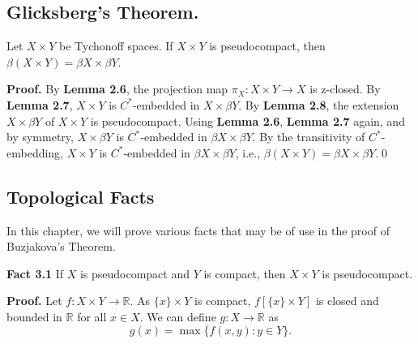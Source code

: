 \documentclass{article}
\begin{document}
\vskip 40pt

\subsection{Glicksberg's Theorem.} Let $X\times Y$ be Tychonoff spaces. If $X\times Y$ is pseudocompact, then $\beta(X\times Y)=\beta X\times \beta Y$. 

\vskip 20pt

\textbf{Proof. } By \textbf{Lemma 2.6}, the projection map $\pi_X: X\times Y\rightarrow X$ is z-closed. By \textbf{Lemma 2.7}, $X\times Y$ is $C^*$-embedded in $X\times \beta Y$. By \textbf{Lemma 2.8}, the extension $X\times \beta Y$ of $X\times Y$ is pseudocompact. Using \textbf{Lemma 2.6}, \textbf{Lemma 2.7} again, and by symmetry, $X\times \beta Y$ is $C^*$-embedded in $\beta X\times \beta Y$. By the transitivity of $C^*$-embedding, $X\times Y$ is $C^*$-embedded in $\beta X\times \beta Y$, i.e., $\beta (X\times Y)=\beta X\times \beta Y$.\qed
















\newpage














\begin{center}

\end{center}
\vskip 40pt
\begin{center}
\section{Topological Facts }
\end{center}
\vskip 20pt

In this chapter, we will prove various facts that may be of use in the proof of Buzjakova's Theorem.


\vskip 20pt
\textbf{Fact 3.1} If $X$ is pseudocompact and $Y$ is compact, then $X\times Y$ is pseudocompact. 

\vskip 15pt


\textbf{Proof.} Let $f: X\times Y \rightarrow \mathbb{R}$. As $\{x\}\times Y$ is compact, $f\left[ \{x\} \times Y\right] $ is 
closed and bounded in $\mathbb{R}$ for all $x \in X$. We can define $g:X \rightarrow \mathbb{R}$ as 
$$g(x)=\max \{f(x,y):y\in Y\}.$$
\end{document}
